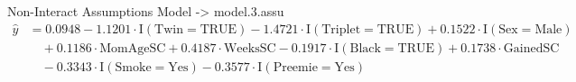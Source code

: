 \documentclass{article}\usepackage[]{graphicx}\usepackage[]{xcolor}
\begin{document}
Non-Interact Assumptions Model -> model.3.assu
\begin{align*}
\hat{y} &= 0.0948 - 1.1201\cdot \text{I}(\text{Twin} = \text{TRUE}) - 1.4721\cdot \text{I}(\text{Triplet} = \text{TRUE}) + 0.1522\cdot \text{I}(\text{Sex} = \text{Male}) \\
&\quad + 0.1186\cdot \text{MomAgeSC} + 0.4187\cdot \text{WeeksSC} - 0.1917\cdot \text{I}(\text{Black} = \text{TRUE}) + 0.1738\cdot \text{GainedSC} \\
&\quad - 0.3343\cdot \text{I}(\text{Smoke} = \text{Yes}) - 0.3577\cdot \text{I}(\text{Preemie} = \text{Yes})
\end{align*}


\end{document}
